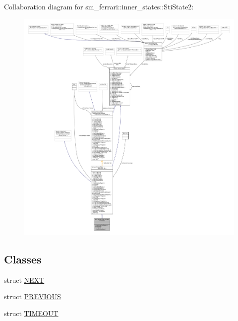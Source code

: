 Collaboration diagram for sm\+\_\+ferrari\+:\+:inner\+\_\+states\+:\+:Sti\+State2\+:
\nopagebreak
\begin{figure}[H]
\begin{center}
\leavevmode
\includegraphics[width=350pt]{structsm__ferrari_1_1inner__states_1_1StiState2__coll__graph}
\end{center}
\end{figure}
\subsection*{Classes}
\begin{DoxyCompactItemize}
\item 
struct \hyperlink{structsm__ferrari_1_1inner__states_1_1StiState2_1_1NEXT}{N\+E\+XT}
\item 
struct \hyperlink{structsm__ferrari_1_1inner__states_1_1StiState2_1_1PREVIOUS}{P\+R\+E\+V\+I\+O\+US}
\item 
struct \hyperlink{structsm__ferrari_1_1inner__states_1_1StiState2_1_1TIMEOUT}{T\+I\+M\+E\+O\+UT}
\end{DoxyCompactItemize}
